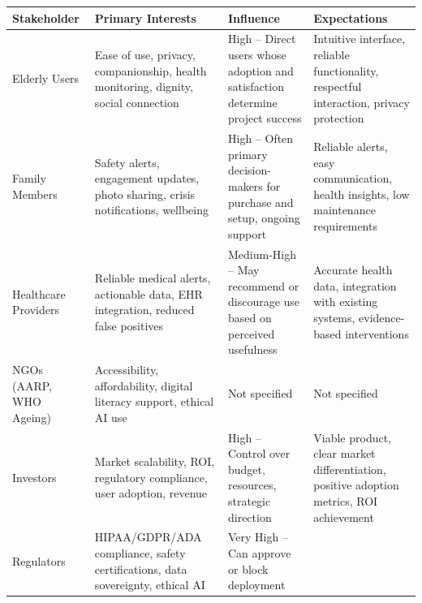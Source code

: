 \documentclass[
  letterpaper,
  DIV=11,
  numbers=noendperiod]{scrartcl}
\begin{document}
\begin{longtable}[]{@{}
  >{\raggedright\arraybackslash}p{}
  >{\raggedright\arraybackslash}p{}
  >{\raggedright\arraybackslash}p{}
  >{\raggedright\arraybackslash}p{}@{}}
\toprule\noalign{}
\begin{minipage}[b]{\linewidth}\raggedright
Stakeholder
\end{minipage} & \begin{minipage}[b]{\linewidth}\raggedright
Primary Interests
\end{minipage} & \begin{minipage}[b]{\linewidth}\raggedright
Influence
\end{minipage} & \begin{minipage}[b]{\linewidth}\raggedright
Expectations
\end{minipage} \\
\midrule\noalign{}
\endhead
\bottomrule\noalign{}
\endlastfoot
Elderly Users & Ease of use, privacy, companionship, health monitoring,
dignity, social connection & High -- Direct users whose adoption and
satisfaction determine project success & Intuitive interface, reliable
functionality, respectful interaction, privacy protection \\
Family Members & Safety alerts, engagement updates, photo sharing,
crisis notifications, wellbeing & High -- Often primary decision-makers
for purchase and setup, ongoing support & Reliable alerts, easy
communication, health insights, low maintenance requirements \\
Healthcare Providers & Reliable medical alerts, actionable data, EHR
integration, reduced false positives & Medium-High -- May recommend or
discourage use based on perceived usefulness & Accurate health data,
integration with existing systems, evidence-based interventions \\
NGOs (AARP, WHO Ageing) & Accessibility, affordability, digital literacy
support, ethical AI use & Not specified & Not specified \\
Investors & Market scalability, ROI, regulatory compliance, user
adoption, revenue & High -- Control over budget, resources, strategic
direction & Viable product, clear market differentiation, positive
adoption metrics, ROI achievement \\
Regulators & HIPAA/GDPR/ADA compliance, safety certifications, data
sovereignty, ethical AI & Very High -- Can approve or block deployment

\end{longtable}
\end{document}
